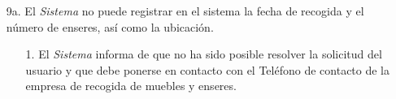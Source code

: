 \begin{enumerate}
\begin{enumerate}
	\end{enumerate}
\item[9a.] El \textit{Sistema} no puede registrar  en el sistema la fecha de recogida y el número de enseres, así como la ubicación.
	\begin{enumerate}
		\item[1.] El \textit{Sistema} informa de que no ha sido posible resolver la solicitud del usuario y que debe ponerse en contacto con el Teléfono de contacto de la empresa de recogida de muebles y enseres.
	\end{enumerate}
\end{enumerate}
